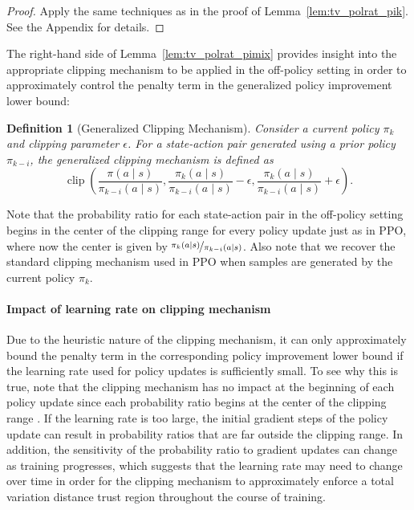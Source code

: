 \documentclass{article}
\newtheorem{definition}{Definition}
\begin{document}
\begin{proof}
Apply the same techniques as in the proof of Lemma~\ref{lem:tv_polrat_pik}. See the Appendix for details.
\end{proof}

The right-hand side of Lemma~\ref{lem:tv_polrat_pimix} provides insight into the appropriate clipping mechanism to be applied in the off-policy setting in order to approximately control the penalty term in the generalized policy improvement lower bound:

\begin{definition}[Generalized Clipping Mechanism]\label{def:genclip}
Consider a current policy $\pi_k$ and clipping parameter $\epsilon$. For a state-action pair generated using a prior policy $\pi_{k-i}$, the \emph{generalized clipping mechanism} is defined as
\begin{equation}
\operatorname{clip}\left( \frac{\pi(a \mid s)}{\pi_{k-i}(a \mid s)},\frac{\pi_k(a \mid s)}{\pi_{k-i}(a \mid s)} - \epsilon,\frac{\pi_k(a \mid s)}{\pi_{k-i}(a \mid s)} + \epsilon \right).
\end{equation}
\end{definition}

Note that the probability ratio for each state-action pair in the off-policy setting begins in the center of the clipping range for every policy update just as in PPO, where now the center is given by $\nicefrac{\pi_k(a \mid s)}{\pi_{k-i}(a \mid s)}$. Also note that we recover the standard clipping mechanism used in PPO when samples are generated by the current policy $\pi_k$.

\paragraph{Impact of learning rate on clipping mechanism}

Due to the heuristic nature of the clipping mechanism, it can only approximately bound the penalty term in the corresponding policy improvement lower bound if the learning rate used for policy updates is sufficiently small. To see why this is true, note that the clipping mechanism has no impact at the beginning of each policy update since each probability ratio begins at the center of the clipping range \citep{engstrom_2020}. If the learning rate is too large, the initial gradient steps of the policy update can result in probability ratios that are far outside the clipping range. In addition, the sensitivity of the probability ratio to gradient updates can change as training progresses, which suggests that the learning rate may need to change over time in order for the clipping mechanism to approximately enforce a total variation distance trust region throughout the course of training.
\end{document}
